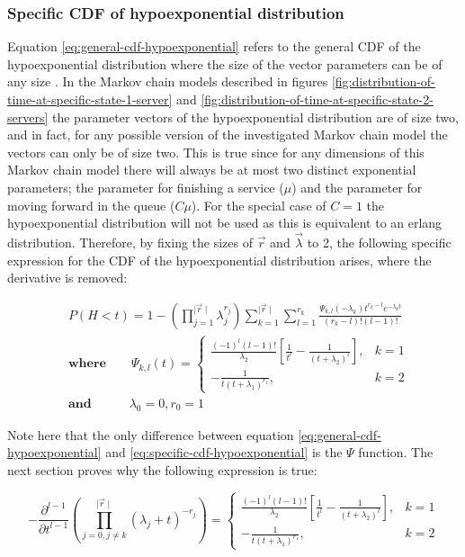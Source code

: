 \subsubsection{Specific CDF of hypoexponential distribution}
Equation \ref{eq:general-cdf-hypoexponential} refers to the general CDF of the
hypoexponential distribution where the size of the vector parameters can be of
any size \cite{Favaro2010}.
In the Markov chain models described in figures 
\ref{fig:distribution-of-time-at-specific-state-1-server} and 
\ref{fig:distribution-of-time-at-specific-state-2-servers} the parameter vectors 
of the hypoexponential distribution are of size two, and in fact, for any 
possible version of the investigated Markov chain model the vectors can only be 
of size two.
This is true since for any dimensions of this Markov chain model there will 
always be at most two distinct exponential parameters; the parameter for 
finishing a service (\(\mu\)) and the parameter for moving forward in the queue 
(\(C \mu\)). 
For the special case of \(C=1\) the hypoexponential distribution will not be 
used as this is equivalent to an erlang distribution.
Therefore, by fixing the sizes of \(\vec{r}\) and \(\vec{\lambda}\) to 2, the 
following specific expression for the CDF of the hypoexponential distribution
arises, where the derivative is removed:


\begin{align} \label{eq:specific-cdf-hypoexponential}
    & P(H < t) = 1 - \left( \prod_{j=1}^{\mid \vec{r} \mid} \lambda_j^{r_j} \right) 
    \sum_{k=1}^{\mid \vec{r} \mid} \sum_{l=1}^{r_k} \frac{\Psi_{k,l}(-\lambda_k)t^{r_k - l} 
    e^{-\lambda_k t}}{(r_k - l)! (l - 1)!} \nonumber \\ 
    & \textbf{where} \qquad \Psi_{k,l}(t) = 
    \begin{cases} 
        \frac{(-1)^{l} (l-1)!}{\lambda_2} \left[\frac{1}{t^l} - \frac{1}
        {(t + \lambda_2)^l}\right] , & k=1 \\
        - \frac{1}{t (t + \lambda_1)^{r_1}}, & k=2
    \end{cases} \nonumber \\
    & \textbf{and} \quad \qquad \lambda_0 = 0, r_0 = 1
\end{align}

Note here that the only difference between equation 
\ref{eq:general-cdf-hypoexponential} and \ref{eq:specific-cdf-hypoexponential} 
is the \(\Psi\) function. The next section proves why the following expression 
is true:

\begin{equation} \label{eq:hypoexponential-expression-to-proof}
    - \frac{\partial^{l - 1}}{\partial t ^{l - 1}} 
    \left( \prod_{j = 0, j \neq k}^{\mid \vec{r} \mid} (\lambda_j + t)^{-r_j} \right) = 
    \begin{cases} 
        \frac{(-1)^{l} (l-1)!}{\lambda_2} \left[\frac{1}{t^l} - \frac{1}
        {(t + \lambda_2)^l}\right] , & k=1 \\
        - \frac{1}{t (t + \lambda_1)^{r_1}}, & k=2
    \end{cases}
\end{equation}



